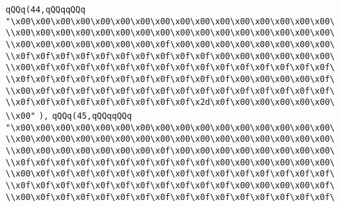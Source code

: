 \verb|qQQq(44,qQQqqQQq|\newline
\verb|"\x00\x00\x00\x00\x00\x00\x00\x00\x00\x00\x00\x00\x00\x00\x00\x00\|\newline
\verb|\\x00\x00\x00\x00\x00\x00\x00\x00\x00\x00\x00\x00\x00\x00\x00\x00\|\newline
\verb|\\x00\x00\x00\x00\x00\x00\x00\x0f\x00\x00\x00\x00\x00\x00\x00\x00\|\newline
\verb|\\x0f\x0f\x0f\x0f\x0f\x0f\x0f\x0f\x0f\x0f\x00\x00\x00\x00\x00\x00\|\newline
\verb|\\x00\x0f\x0f\x0f\x0f\x0f\x0f\x0f\x0f\x0f\x0f\x0f\x0f\x0f\x0f\x0f\|\newline
\verb|\\x0f\x0f\x0f\x0f\x0f\x0f\x0f\x0f\x0f\x0f\x0f\x00\x00\x00\x00\x0f\|\newline
\verb|\\x00\x0f\x0f\x0f\x0f\x0f\x0f\x0f\x0f\x0f\x0f\x0f\x0f\x0f\x0f\x0f\|\newline
\verb|\\x0f\x0f\x0f\x0f\x0f\x0f\x0f\x0f\x0f\x2d\x0f\x00\x00\x00\x00\x00\|\newline
\verb|\\x00"|\newline
\verb|),|\newline
\verb|qQQq(45,qQQqqQQq|\newline
\verb|"\x00\x00\x00\x00\x00\x00\x00\x00\x00\x00\x00\x00\x00\x00\x00\x00\|\newline
\verb|\\x00\x00\x00\x00\x00\x00\x00\x00\x00\x00\x00\x00\x00\x00\x00\x00\|\newline
\verb|\\x00\x00\x00\x00\x00\x00\x00\x0f\x00\x00\x00\x00\x00\x00\x00\x00\|\newline
\verb|\\x0f\x0f\x0f\x0f\x0f\x0f\x0f\x0f\x0f\x0f\x00\x00\x00\x00\x00\x00\|\newline
\verb|\\x00\x0f\x0f\x0f\x0f\x0f\x0f\x0f\x0f\x0f\x0f\x0f\x0f\x0f\x0f\x0f\|\newline
\verb|\\x0f\x0f\x0f\x0f\x0f\x0f\x0f\x0f\x0f\x0f\x0f\x00\x00\x00\x00\x0f\|\newline
\verb|\\x00\x0f\x0f\x0f\x0f\x0f\x0f\x0f\x0f\x0f\x0f\x0f\x0f\x0f\x0f\x0f\|\newline
